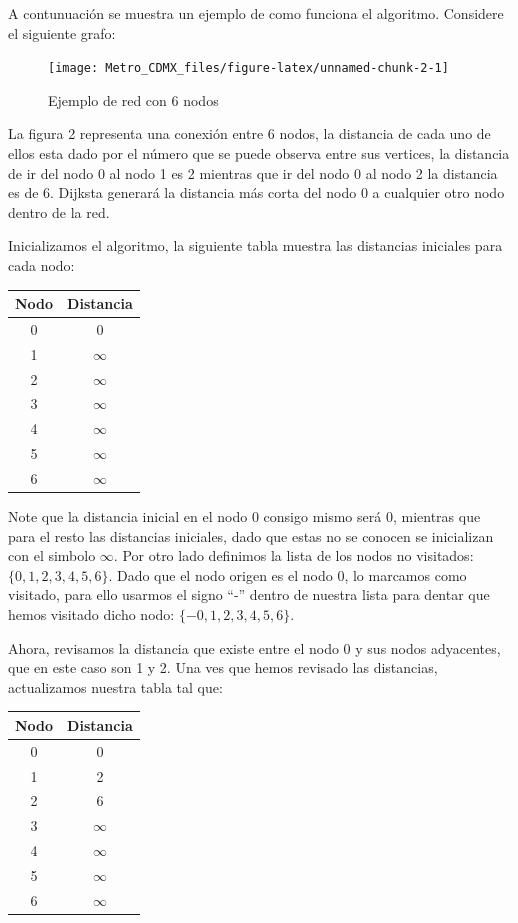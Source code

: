 \documentclass[
]{article}
\begin{document}
A contunuación se muestra un ejemplo de como funciona el algoritmo.
Considere el siguiente grafo:

\begin{figure}

{\centering \texttt{[image: Metro\_CDMX\_files/figure-latex/unnamed-chunk-2-1]} 

}

\caption{Ejemplo de red con 6 nodos}\label{fig:unnamed-chunk-2}
\end{figure}

La figura 2 representa una conexión entre 6 nodos, la distancia de cada
uno de ellos esta dado por el número que se puede observa entre sus
vertices, la distancia de ir del nodo 0 al nodo 1 es 2 mientras que ir
del nodo 0 al nodo 2 la distancia es de 6. Dijksta generará la distancia
más corta del nodo 0 a cualquier otro nodo dentro de la red.

Inicializamos el algoritmo, la siguiente tabla muestra las distancias
iniciales para cada nodo:

\begin{longtable}[]{@{}cc@{}}
\toprule()
Nodo & Distancia \\
\midrule()
\endhead
0 & 0 \\
1 & \(\infty\) \\
2 & \(\infty\) \\
3 & \(\infty\) \\
4 & \(\infty\) \\
5 & \(\infty\) \\
6 & \(\infty\) \\
\bottomrule()
\end{longtable}

Note que la distancia inicial en el nodo 0 consigo mismo será 0,
mientras que para el resto las distancias iniciales, dado que estas no
se conocen se inicializan con el simbolo \(\infty\). Por otro lado
definimos la lista de los nodos no visitados: \(\{0,1,2,3,4,5,6 \}\).
Dado que el nodo origen es el nodo 0, lo marcamos como visitado, para
ello usarmos el signo ``-'' dentro de nuestra lista para dentar que
hemos visitado dicho nodo: \(\{-0,1,2,3,4,5,6 \}\).

Ahora, revisamos la distancia que existe entre el nodo 0 y sus nodos
adyacentes, que en este caso son 1 y 2. Una ves que hemos revisado las
distancias, actualizamos nuestra tabla tal que:

\begin{longtable}[]{@{}cc@{}}
\toprule()
Nodo & Distancia \\
\midrule()
\endhead
0 & 0 \\
1 & 2 \\
2 & 6 \\
3 & \(\infty\) \\
4 & \(\infty\) \\
5 & \(\infty\) \\
6 & \(\infty\) \\
\bottomrule()
\end{longtable}
\end{document}
